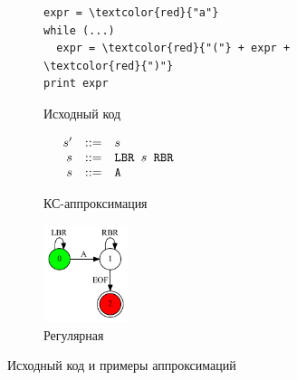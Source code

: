 \begin{figure}[!h]
	\centering
	\begin{subfigure}[h!]{0.33\textwidth}
		\centering
		\begin{minipage}{5cm}
			\begin{Verbatim}[commandchars=\\\{\}]
expr = \textcolor{red}{"a"}
while (...)
  expr = \textcolor{red}{"("} + expr + \textcolor{red}{")"}
print expr
			\end{Verbatim}
		\end{minipage}
		\caption{Исходный код}
		\label{fig:code}
	\end{subfigure}
	\hfill
	\begin{subfigure}[h!]{0.3\textwidth}
		\centering
		$
		\begin{array}{crcl}
			&s' &::=& s \\
			&s & ::= & \mbox{\texttt{LBR }} s \mbox{\texttt{ RBR}}\\
			&s & ::= & \mbox{\texttt{A}}
		\end{array}
		$
		\caption{КС-аппроксимация}
		\label{fig:app_cf}
	\end{subfigure}
	\hfill
	\begin{subfigure}[h!]{0.3\textwidth}
		\centering
		\includegraphics[width=2.5cm]{pictures/reg_app}
		\caption{Регулярная}
		\label{fig:app_r}
	\end{subfigure}
	\caption{Исходный код и примеры аппроксимаций}
	\label{example}
\end{figure}